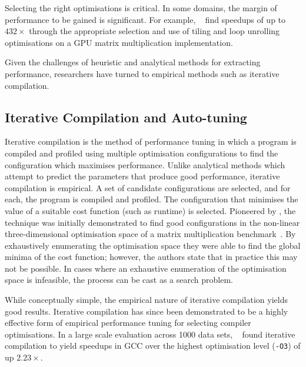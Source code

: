 Selecting the right optimisations is critical. In some domains, the margin of performance to be gained is significant. For example, \citeauthor{Ryoo2008a}~\cite{Ryoo2008a} find speedups of up to $432\times$ through the appropriate selection and use of tiling and loop unrolling optimisations on a GPU matrix multiplication implementation.

Given the challenges of heuristic and analytical methods for extracting performance, researchers have turned to empirical methods such as iterative compilation.


\subsection{Iterative Compilation and Auto-tuning}

Iterative compilation is the method of performance tuning in which a program is compiled and profiled using multiple optimisation configurations to find the configuration which maximises performance. Unlike analytical methods which attempt to predict the parameters that produce good performance, iterative compilation is empirical. A set of candidate configurations are selected, and for each, the program is compiled and profiled. The configuration that minimises the value of a suitable cost function (such as runtime) is selected. Pioneered by \citeauthor{Bodin1998}, the technique was initially demonstrated to find good configurations in the non-linear three-dimensional optimisation space of a matrix multiplication benchmark~\cite{Bodin1998}. By exhaustively enumerating the optimisation space they were able to find the global minima of the cost function; however, the authors state that in practice this may not be possible. In cases where an exhaustive enumeration of the optimisation space is infeasible, the process can be cast as a search problem.

While conceptually simple, the empirical nature of iterative compilation yields good results. Iterative compilation has since been demonstrated to be a highly effective form of empirical performance tuning for selecting compiler optimisations.
In a large scale evaluation across 1000 data sets, \citeauthor{Chen2010}~\cite{Chen2010} found iterative compilation to yield speedups in GCC over the highest optimisation level (\texttt{-O3}) of up $2.23\times$.

